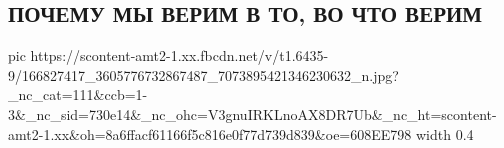  
 
 
 
 

\subsection{ПОЧЕМУ МЫ ВЕРИМ В ТО, ВО ЧТО ВЕРИМ}
\label{sec:05_04_2021.fb.zygmantovich_pavel.1.ubezhdenie}

\ifcmt
  pic https://scontent-amt2-1.xx.fbcdn.net/v/t1.6435-9/166827417_3605776732867487_7073895421346230632_n.jpg?_nc_cat=111&ccb=1-3&_nc_sid=730e14&_nc_ohc=V3gnuIRKLnoAX8DR7Ub&_nc_ht=scontent-amt2-1.xx&oh=8a6ffacf61166f5c816e0f77d739d839&oe=608EE798
  width 0.4
\fi

